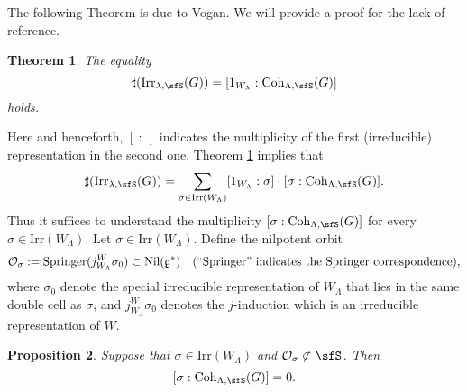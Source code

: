 \documentclass[12pt,a4paper]{amsart}
\newcommand{\CO}{{\mathcal {O}}}
\newcommand{\g}{\mathfrak g}
\numberwithin{equation}{section}
\newtheorem{thm}{Theorem}[section]
\newtheorem{prop}[thm]{Proposition}
\theoremstyle{remark}
\def\Irr{\mathrm{Irr}}
\def\Coh{\mathrm{Coh}}
\providecommand{\nsubset}{\not\subset}
\begin{document}
The following Theorem is due to Vogan. We will provide a proof for the lack of reference. 
\begin{thm}\label{count1}
The equality 
  \[
    \sharp(\Irr_{\lambda,\sfS}(G)) = [1_{W_{\lambda}}:\Coh_{\Lambda,\sfS}(G)]
  \]
  holds. 
\end{thm}
Here and henceforth, $[\ : \ ]$ indicates the multiplicity of the first (irreducible) representation in the second one. 
Theorem \ref{count1} implies that
 \begin{equation}\label{countlg}
    \sharp(\Irr_{\lambda,\sfS}(G)) = \sum_{\sigma\in \Irr(W_\Lambda)} [1_{W_{\lambda}}: \sigma]\cdot [\sigma: \Coh_{\Lambda,\sfS}(G)].
  \end{equation}
Thus it suffices to understand the multiplicity $ [\sigma: \Coh_{\Lambda,\sfS}(G)]$ for every $\sigma\in \Irr(W_\Lambda)$.  Let $\sigma\in  \Irr(W_\Lambda)$.  Define the nilpotent orbit
\[
\CO_\sigma:=\mathrm{Springer}(j_{W_\Lambda}^W \sigma_0)\subset \mathrm{Nil}(\g^*) \quad (``\mathrm{Springer}"\textrm{ indicates the Springer correspondence}),
\]
where  $\sigma_0$ denote the special irreducible representation of $W_\Lambda$ that lies in the same double cell as  $\sigma$, and $j_{W_\Lambda}^W \sigma_0$ denotes the $j$-induction which is an irreducible representation of $W$. 



\begin{prop}\label{count2}
Suppose that $\sigma\in  \Irr(W_\Lambda)$ and $\CO_\sigma\nsubset \sfS$. Then 
  \[
    [\sigma: \Coh_{\Lambda,\sfS}(G)]=0.
  \]
 
\end{prop}
\end{document}
